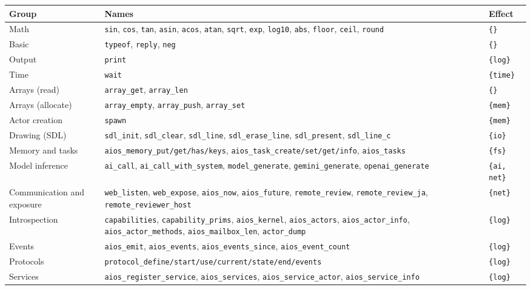 \documentclass[11pt,a4paper]{article}
\newcommand{\eff}[1]{\texttt{\{#1\}}}
\begin{document}
\begin{center}
\small
\begin{tabular}{@{}lp{9.4cm}l@{}}
\toprule
Group & Names & Effect \\
\midrule
Math & \texttt{sin}, \texttt{cos}, \texttt{tan}, \texttt{asin}, \texttt{acos},
  \texttt{atan}, \texttt{sqrt}, \texttt{exp}, \texttt{log10}, \texttt{abs},
  \texttt{floor}, \texttt{ceil}, \texttt{round} & \eff{} \\
Basic & \texttt{typeof}, \texttt{reply}, \texttt{neg} & \eff{} \\
Output & \texttt{print} & \eff{log} \\
Time & \texttt{wait} & \eff{time} \\
Arrays (read) & \texttt{array\_get}, \texttt{array\_len} & \eff{} \\
Arrays (allocate) & \texttt{array\_empty}, \texttt{array\_push}, \texttt{array\_set} & \eff{mem} \\
Actor creation & \texttt{spawn} & \eff{mem} \\
Drawing (SDL) & \texttt{sdl\_init}, \texttt{sdl\_clear}, \texttt{sdl\_line},
  \texttt{sdl\_erase\_line}, \texttt{sdl\_present}, \texttt{sdl\_line\_c} & \eff{io} \\
Memory and tasks & \texttt{aios\_memory\_put/get/has/keys},
  \texttt{aios\_task\_create/set/get/info}, \texttt{aios\_tasks} & \eff{fs} \\
Model inference & \texttt{ai\_call}, \texttt{ai\_call\_with\_system},
  \texttt{model\_generate}, \texttt{gemini\_generate},
  \texttt{openai\_generate} & \eff{ai, net} \\
Communication and exposure & \texttt{web\_listen}, \texttt{web\_expose},
  \texttt{aios\_now}, \texttt{aios\_future},
  \texttt{remote\_review}, \texttt{remote\_review\_ja},
  \texttt{remote\_reviewer\_host} & \eff{net} \\
Introspection & \texttt{capabilities}, \texttt{capability\_prims},
  \texttt{aios\_kernel}, \texttt{aios\_actors}, \texttt{aios\_actor\_info},
  \texttt{aios\_actor\_methods}, \texttt{aios\_mailbox\_len},
  \texttt{actor\_dump} & \eff{log} \\
Events & \texttt{aios\_emit}, \texttt{aios\_events},
  \texttt{aios\_events\_since}, \texttt{aios\_event\_count} & \eff{log} \\
Protocols & \texttt{protocol\_define/start/use/current/state/end/events} & \eff{log} \\
Services & \texttt{aios\_register\_service}, \texttt{aios\_services},
  \texttt{aios\_service\_actor}, \texttt{aios\_service\_info} & \eff{log} \\
\bottomrule
\end{tabular}
\end{center}
\end{document}
